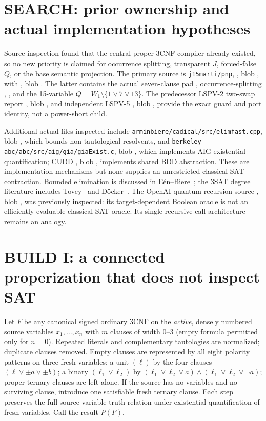 \documentclass[11pt]{article}
\begin{document}
\section{SEARCH: prior ownership and actual implementation hypotheses}
Source inspection found that the central proper-3CNF compiler already existed, so no new priority is claimed for occurrence splitting, transparent $J$, forced-false $Q$, or the base semantic projection. The primary source is \texttt{j15marti/pnp}, , blob , with , blob . The latter contains the actual seven-clause pad , occurrence-splitting , , and the 15-variable $Q=W_1\setminus\{1\lor7\lor13\}$. The predecessor LSPV-2 two-swap report , blob , and independent LSPV-5 , blob , provide the exact guard and port identity, not a power-short child.

Additional actual files inspected include \texttt{arminbiere/cadical/src/elimfast.cpp}, blob , which bounds non-tautological resolvents, and \texttt{berkeley-abc/abc/src/aig/gia/giaExist.c}, blob , which implements AIG existential quantification; CUDD , blob , implements shared BDD abstraction. These are implementation mechanisms but none supplies an unrestricted classical SAT contraction. Bounded elimination is discussed in E\'en--Biere~\cite{eenbiere}; the 3SAT degree literature includes Tovey~\cite{tovey} and D\"ocker~\cite{docker}. The OpenAI quantum-recursion source , blob , was previously inspected: its target-dependent Boolean oracle is not an efficiently evaluable classical SAT oracle. Its single-recursive-call architecture remains an analogy.

\section{BUILD I: a connected properization that does not inspect SAT}
Let $F$ be any canonical signed ordinary $3$CNF on the \emph{active}, densely numbered source variables $x_1,\ldots,x_n$ with $m$ clauses of width $0$--$3$ (empty formula permitted only for $n=0$). Repeated literals and complementary tautologies are normalized; duplicate clauses removed. Empty clauses are represented by all eight polarity patterns on three fresh variables; a unit $(\ell)$ by the four clauses $(\ell\vee\pm a\vee\pm b)$; a binary $(\ell_1\vee\ell_2)$ by $(\ell_1\vee\ell_2\vee a)\wedge(\ell_1\vee\ell_2\vee\neg a)$; proper ternary clauses are left alone. If the source has no variables and no surviving clause, introduce one satisfiable fresh ternary clause. Each step preserves the full source-variable truth relation under existential quantification of fresh variables. Call the result $P(F)$.
\end{document}
